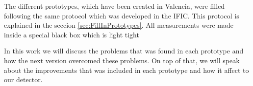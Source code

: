 The different prototypes, which have been created in Valencia, were filled following the same protocol which was developed in the IFIC. This protocol is explained in the seccion \ref{sec:FillInPrototypes}. All measurements were made inside a special black box which is light tight

In this work we will discuss the problems that was found in each prototype and how the next version overcomed these problems. On top of that, we will speak about the improvements that was included in each prototype and how it affect to our detector.